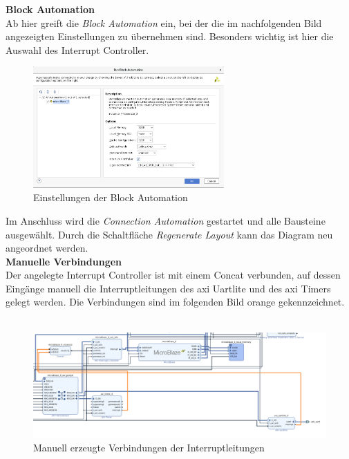 \vspace{10mm}

\textbf{Block Automation}\\

Ab hier greift die \emph{Block Automation} ein, bei der die im nachfolgenden Bild angezeigten Einstellungen zu übernehmen sind.
Besonders wichtig ist hier die Auswahl des Interrupt Controller.

\begin{figure}[H]
\centering
\includegraphics[width=0.65\textwidth]{Hauptteil/schritt7.png}
\caption{Einstellungen der Block Automation}\label{fig:mbschritt7}
\end{figure}


Im Anschluss wird die \emph{Connection Automation} gestartet und alle Bausteine ausgewählt.
Durch die Schaltfläche \emph{Regenerate Layout} kann das Diagram neu angeordnet werden.\\

\textbf{Manuelle Verbindungen}\\

Der angelegte Interrupt Controller ist mit einem Concat verbunden, auf dessen Eingänge manuell die Interruptleitungen des \ac{axi} Uartlite und des \ac{axi} Timers gelegt werden.
Die Verbindungen sind im folgenden Bild orange gekennzeichnet.\\\\

\begin{figure}[H]
\centering
\includegraphics[width=1\textwidth]{Hauptteil/Schritt8.png}
\caption{Manuell erzeugte Verbindungen der Interruptleitungen}\label{fig:mbschritt8}
\end{figure}

